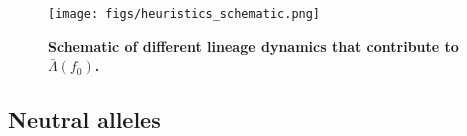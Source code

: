 \documentclass[aps,rmp,twocolumn,groupedaddress,floatfix,notitlepage]{revtex4-1}
\begin{document}
\begin{itemize}




\end{itemize}

\begin{figure*}[h!]
    \centering
    \texttt{[image: figs/heuristics\_schematic.png]} 
    \hfill
    \caption{\textbf{Schematic of different lineage dynamics that contribute to $\bar{\Lambda}(f_0)$.}  \label{fig:heuristics_schematic}}
\end{figure*}

\newpage
\subsection*{Neutral alleles}
\end{document}
